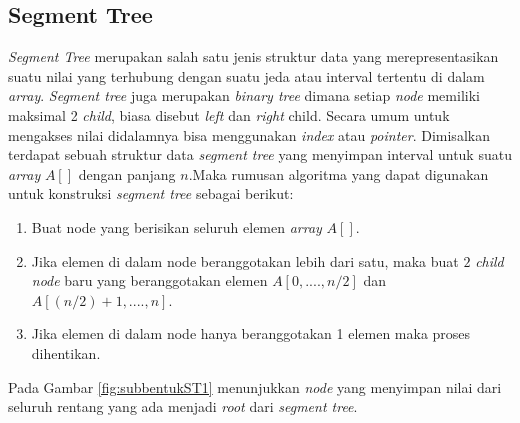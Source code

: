 \documentclass[a4paper]{IEEEtran}
\begin{document}
\subsection{Segment Tree}
\quad\textit{Segment Tree} merupakan salah satu jenis struktur data yang merepresentasikan suatu nilai yang terhubung dengan suatu jeda atau interval tertentu di dalam \textit{array}\cite{ST}. \textit{Segment tree} juga merupakan \textit{binary tree} dimana setiap \textit{node} memiliki maksimal 2 \textit{child}, biasa disebut \textit{left} dan \textit{right} child. Secara umum untuk mengakses nilai didalamnya bisa menggunakan \textit{index} atau \textit{pointer}.
Dimisalkan terdapat sebuah struktur data \textit{segment tree} yang menyimpan interval untuk suatu \textit{array} $A[]$ dengan panjang $n$.Maka rumusan algoritma yang dapat digunakan untuk konstruksi \textit{segment tree} sebagai berikut\cite{ST2}:
\begin{enumerate}
	\item Buat node yang berisikan seluruh elemen \textit{array} $A[]$.
	\item Jika elemen di dalam node beranggotakan lebih dari satu, maka buat $2$ \textit{child node} baru yang beranggotakan elemen $A[0,... .,n/2]$ dan $A[(n/2)+1,... .,n]$.
	\item Jika elemen di dalam node hanya beranggotakan 1 elemen maka proses dihentikan.
\end{enumerate}
\quad Pada Gambar \ref{fig:subbentukST1} menunjukkan  \textit{node} yang menyimpan nilai dari seluruh rentang yang ada menjadi \textit{root} dari \textit{segment tree}.
\end{document}
